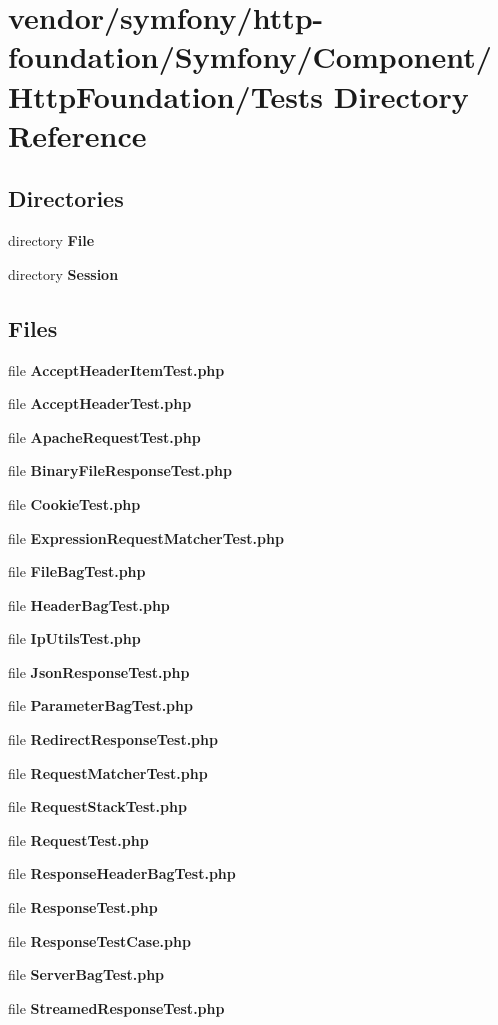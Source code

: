 \section{vendor/symfony/http-\/foundation/\+Symfony/\+Component/\+Http\+Foundation/\+Tests Directory Reference}
\label{dir_4fb78297c75b7325d67f52c6ea12fbd5}
\subsection*{Directories}
\begin{DoxyCompactItemize}
\item 
directory {\bf File}
\item 
directory {\bf Session}
\end{DoxyCompactItemize}
\subsection*{Files}
\begin{DoxyCompactItemize}
\item 
file {\bf Accept\+Header\+Item\+Test.\+php}
\item 
file {\bf Accept\+Header\+Test.\+php}
\item 
file {\bf Apache\+Request\+Test.\+php}
\item 
file {\bf Binary\+File\+Response\+Test.\+php}
\item 
file {\bf Cookie\+Test.\+php}
\item 
file {\bf Expression\+Request\+Matcher\+Test.\+php}
\item 
file {\bf File\+Bag\+Test.\+php}
\item 
file {\bf Header\+Bag\+Test.\+php}
\item 
file {\bf Ip\+Utils\+Test.\+php}
\item 
file {\bf Json\+Response\+Test.\+php}
\item 
file {\bf Parameter\+Bag\+Test.\+php}
\item 
file {\bf Redirect\+Response\+Test.\+php}
\item 
file {\bf Request\+Matcher\+Test.\+php}
\item 
file {\bf Request\+Stack\+Test.\+php}
\item 
file {\bf Request\+Test.\+php}
\item 
file {\bf Response\+Header\+Bag\+Test.\+php}
\item 
file {\bf Response\+Test.\+php}
\item 
file {\bf Response\+Test\+Case.\+php}
\item 
file {\bf Server\+Bag\+Test.\+php}
\item 
file {\bf Streamed\+Response\+Test.\+php}
\end{DoxyCompactItemize}
